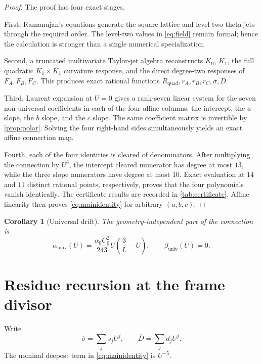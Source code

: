 \documentclass[11pt]{article}
\newtheorem{corollary}[theorem]{Corollary}
\theoremstyle{definition}
\theoremstyle{remark}
\newcommand{\bsigma}{\overline{\sigma}}
\newcommand{\bD}{\overline{D}}
\begin{document}
\begin{proof}
The proof has four exact stages.

First, Ramanujan's equations generate the square-lattice and level-two theta jets through the required order.  The level-two values in \eqref{eq:field} remain formal; hence the calculation is stronger than a single numerical specialization.

Second, a truncated multivariate Taylor-jet algebra reconstructs $K_0$, $K_1$, the full quadratic $K_1\times K_1$ curvature response, and the direct degree-two responses of $F_A,F_B,F_C$.  This produces exact rational functions $R_{\mathrm{quad}},r_A,r_B,r_C,\bsigma,\bD$.

Third, Laurent expansion at $U=0$ gives a rank-seven linear system for the seven non-universal coefficients in each of the four affine columns: the intercept, the $a$ slope, the $b$ slope, and the $c$ slope.  The same coefficient matrix is invertible by \cref{prop:polar}.  Solving the four right-hand sides simultaneously yields an exact affine connection map.

Fourth, each of the four identities is cleared of denominators.  After multiplying the connection by $U^3$, the intercept cleared numerator has degree at most $13$, while the three slope numerators have degree at most $10$.  Exact evaluation at $14$ and $11$ distinct rational points, respectively, proves that the four polynomials vanish identically.  The certificate results are recorded in \cref{tab:certificate}.  Affine linearity then proves \eqref{eq:mainidentity} for arbitrary $(a,b,c)$.
\end{proof}

\begin{corollary}[Universal drift]\label{cor:drift}
The geometry-independent part of the connection is
\begin{equation}\label{eq:drift}
 \boxed{
 \alpha_{\mathrm{univ}}(U)
 =\frac{\alpha_0C_0^2}{243}U\left(\frac3L-U\right),
 \qquad
 \beta_{\mathrm{univ}}(U)=0.
 }
\end{equation}
\end{corollary}

\section{Residue recursion at the frame divisor}

Write
\[
 \bsigma=\sum_j s_jU^j,
 \qquad
 \bD=\sum_j d_jU^j.
\]
The nominal deepest term in \eqref{eq:mainidentity} is $U^{-5}$.
\end{document}
